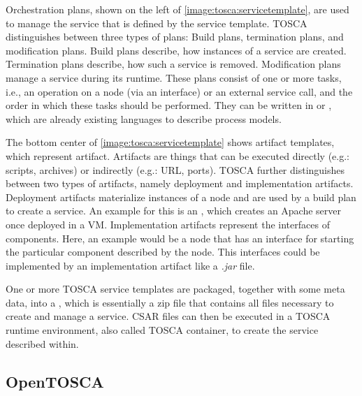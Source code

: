 Orchestration plans, shown on the left of \autoref{image:tosca:servicetemplate}, are used to manage the service that is defined by the service template. TOSCA distinguishes between three types of plans: Build plans, termination plans, and modification plans.
Build plans describe, how instances of a service are created.
Termination plans describe, how such a service is removed.
Modification plans manage a service during its runtime.
These plans consist of one or more tasks, i.e., an operation on a node (via an interface) or an external service call, and the order in which these tasks should be performed.
They can be written in  or , which are already existing languages to describe process models.

The bottom center of \autoref{image:tosca:servicetemplate} shows artifact templates, which represent artifact.
Artifacts are things that can be executed directly (e.g.: scripts, archives) or indirectly (e.g.: URL, ports).
TOSCA further distinguishes between two types of artifacts, namely deployment and implementation artifacts.
Deployment artifacts materialize instances of a node and are used by a build plan to create a service.
An example for this is an , which creates an Apache server once deployed in a VM.
Implementation artifacts represent the interfaces of components.
Here, an example would be a node that has an interface for starting the particular component described by the node.
This interfaces could be implemented by an implementation artifact like a \textit{.jar} file.

One or more TOSCA service templates are packaged, together with some meta data, into a , which is essentially a zip file that contains all files necessary to create and manage a service.
CSAR files can then be executed in a TOSCA runtime environment, also called TOSCA container, to create the service described within.

\subsection{OpenTOSCA}

